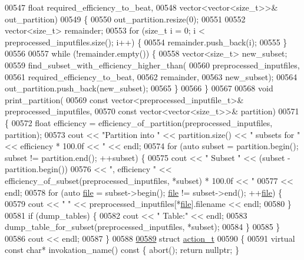 \begin{DoxyCode}
{{00547        \textcolor{keywordtype}{float} required\_efficiency\_to\_beat,
00548        vector<vector<size\_t>>& out\_partition)
00549 \{
00550   out\_partition.resize(0);
00551 
00552   vector<size\_t> remainder;
00553   \textcolor{keywordflow}{for} (\textcolor{keywordtype}{size\_t} i = 0; i < preprocessed\_inputfiles.size(); i++) \{
00554     remainder.push\_back(i);
00555   \}
00556 
00557   \textcolor{keywordflow}{while} (!remainder.empty()) \{
00558     vector<size\_t> new\_subset;
00559     find\_subset\_with\_efficiency\_higher\_than(
00560       preprocessed\_inputfiles,
00561       required\_efficiency\_to\_beat,
00562       remainder,
00563       new\_subset);
00564     out\_partition.push\_back(new\_subset);
00565   \}
00566 \}
00567 
00568 \textcolor{keywordtype}{void} print\_partition(
00569        \textcolor{keyword}{const} vector<preprocessed\_inputfile\_t>& preprocessed\_inputfiles,
00570        \textcolor{keyword}{const} vector<vector<size\_t>>& partition)
00571 \{
00572   \textcolor{keywordtype}{float} efficiency = efficiency\_of\_partition(preprocessed\_inputfiles, partition);
00573   cout << \textcolor{stringliteral}{"Partition into "} << partition.size() << \textcolor{stringliteral}{" subsets for "} << efficiency * 100.0f << \textcolor{stringliteral}{"%
        << endl;
00574   \textcolor{keywordflow}{for} (\textcolor{keyword}{auto} subset = partition.begin(); subset != partition.end(); ++subset) \{
00575     cout << \textcolor{stringliteral}{"  Subset "} << (subset - partition.begin())
00576          << \textcolor{stringliteral}{", efficiency "} << efficiency\_of\_subset(preprocessed\_inputfiles, *subset) * 100.0f << \textcolor{stringliteral}{"%
00577          << endl;
00578     \textcolor{keywordflow}{for} (\textcolor{keyword}{auto} \hyperlink{structfile}{file} = subset->begin(); \hyperlink{structfile}{file} != subset->end(); ++\hyperlink{structfile}{file}) \{
00579       cout << \textcolor{stringliteral}{"    "} << preprocessed\_inputfiles[*\hyperlink{structfile}{file}].filename << endl;
00580     \}
00581     \textcolor{keywordflow}{if} (dump\_tables) \{
00582       cout << \textcolor{stringliteral}{"  Table:"} << endl;
00583       dump\_table\_for\_subset(preprocessed\_inputfiles, *subset);
00584     \}
00585   \}
00586   cout << endl;
00587 \}
00588 
\hyperlink{structaction__t}{00589} \textcolor{keyword}{struct }\hyperlink{structaction__t}{action\_t}
00590 \{
00591   \textcolor{keyword}{virtual} \textcolor{keyword}{const} \textcolor{keywordtype}{char}* invokation\_name()\textcolor{keyword}{ const }\{ abort(); \textcolor{keywordflow}{return} \textcolor{keyword}{nullptr}; \}
}}}}
\end{DoxyCode}
